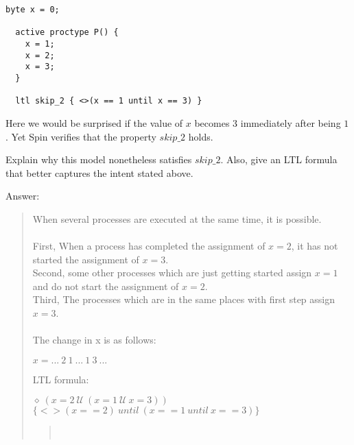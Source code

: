 \documentclass{article}
\begin{document}
\begin{Question} 

\begin{lstlisting}[language=Promela]
  byte x = 0;

  active proctype P() {
    x = 1;
    x = 2;
    x = 3;
  }

  ltl skip_2 { <>(x == 1 until x == 3) }
\end{lstlisting}

Here we would be surprised if the value of $x$ becomes $3$ immediately after being $1$. Yet Spin verifies that the property $skip\_2$ holds.

Explain why this model nonetheless satisfies $skip\_2$. Also, give an LTL formula that better captures the intent stated above.

\begin{answer}
Answer: 
\begin{quote}
  When several processes are executed at the same time, it is possible.\\\\
  First, When a process has completed the assignment of $x=2$, it has not started the assignment of $x = 3$. \\
  Second, some other processes which are just getting started assign $x=1$ and do not start the assignment of $x=2$.\\
  Third, The processes which are in the same places with first step assign $x=3$.\\\\
  The change in x is as follows:
  \begin{center}
    $x= ...\ 2\ 1\ ...\ 1\ 3\ ...$
  \end{center}

  LTL formula:
  \begin{center}
    $ \diamond\  (x = 2\ \mathcal{U}\ (x = 1 \ \mathcal{U}\ x = 3)) $\\
  $ \{<> (x == 2)\ until\ (x == 1\ until\ x == 3)\}$
  \end{center}
  \begin{quote}
    \\
  \end{quote}
  
\end{quote}
\end{answer}


\end{Question}
\end{document}
